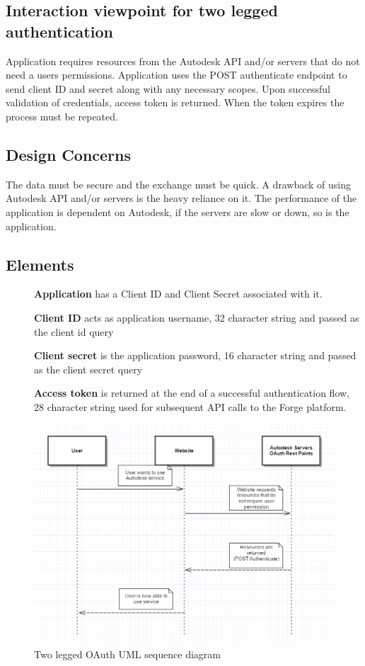 \documentclass[letterpaper, 10pt, draftclsnofoot, compsoc, onecolumn]{IEEEtran}
\begin{document}
\subsection{Interaction viewpoint for two legged authentication}
	Application requires resources from the Autodesk API and/or servers that do not need a users permissions. Application uses the POST authenticate endpoint to send client ID and secret along with any necessary scopes. Upon successful validation of credentials, access token is returned. When the token expires the process must be repeated.
\subsection{Design Concerns}
	The data must be secure and the exchange must be quick. A drawback of using Autodesk API and/or servers is the heavy reliance on it. The performance of the application is dependent on Autodesk, if the servers are slow or down, so is the application.
\subsection{Elements}
\begin{description}
	\item[]\textbf{Application} has a Client ID and Client Secret associated with it.
	\item[]\textbf{Client ID} acts as application username, 32 character string and passed as the client id query
	\item[]\textbf{Client secret} is the application password, 16 character string and passed as the client secret query
	\item[]\textbf{Access token} is returned at the end of a successful authentication flow, 28 character string used for subsequent API calls to the Forge platform. 
\end{description}

\begin{figure}[ht]
	\includegraphics[scale=0.7]{Authentication2legged.png}
	\caption{Two legged OAuth UML sequence diagram}
\end{figure}
\end{document}
